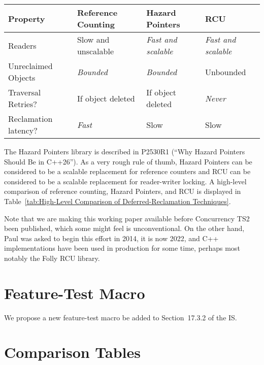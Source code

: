 \begin{table*}
\renewcommand*{\arraystretch}{1.25}
\footnotesize
\centering
\begin{tabular}{l|lll}
	Property
		& Reference Counting
			& Hazard Pointers
				& RCU \\
	\hline
	\hline
	Readers
		& Slow and unscalable
			& \emph{Fast and scalable}
				& \emph{Fast and scalable} \\
	\hline
	Unreclaimed Objects
		& \emph{Bounded}
			& \emph{Bounded}
				& Unbounded \\
	\hline
	Traversal Retries?
		& If object deleted
			& If object deleted
				& \emph{Never} \\
	\hline
	Reclamation latency?
		& \emph{Fast}
			& Slow
				& Slow \\
\end{tabular}
\caption{High-Level Comparison of Deferred-Reclamation Techniques}
\label{tab:High-Level Comparison of Deferred-Reclamation Techniques}
\end{table*}

The Hazard Pointers library is described in P2530R1 (``Why Hazard Pointers
Should Be in C++26'').
As a very rough rule of thumb, Hazard Pointers can be considered to be
a scalable replacement for reference counters and RCU can be considered
to be a scalable replacement for reader-writer locking.
A high-level comparison of reference counting, Hazard Pointers, and RCU
is displayed in
Table~\ref{tab:High-Level Comparison of Deferred-Reclamation Techniques}.

Note that we are making this working paper available before Concurrency
TS2 been published, which some might feel is unconventional.
On the other hand, Paul was asked to begin this effort in 2014, it is now
2022, and C++ implementations have been used in production for some time,
perhaps most notably the Folly RCU library.

\section{Feature-Test Macro}
\label{sec:Feature-Test Macro}

We propose a new feature-test macro
 be added to Section~17.3.2 of the IS.

\section{Comparison Tables}
\label{sec:Comparison Tables}

